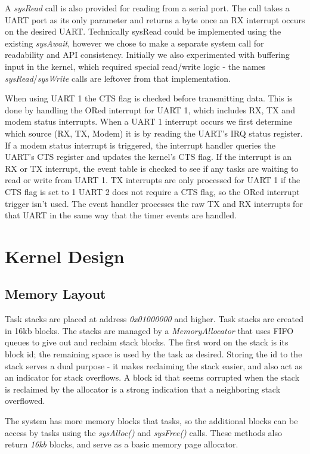 \documentclass[twoside,a4paper]{refart}
\begin{document}
A \textit{sysRead} call is also provided for reading from a serial port. The call takes a UART port as its only parameter and returns a byte once an RX interrupt occurs on the desired UART. Technically sysRead could be implemented using the existing \textit{sysAwait}, however we chose to make a separate system call for readability and API consistency. Initially we also experimented with buffering input in the kernel, which required special read/write logic - the names \textit{sysRead}/\textit{sysWrite} calls are leftover from that implementation.

When using UART 1 the CTS flag is checked before transmitting data. This is done by handling the ORed interrupt for UART 1, which includes RX, TX and modem status interrupts. When a UART 1 interrupt occurs we first determine which source (RX, TX, Modem) it is by reading the UART’s IRQ status register. If a modem status interrupt is triggered, the interrupt handler queries the UART’s CTS register and updates the kernel’s CTS flag. If the interrupt is an RX or TX interrupt, the event table is checked to see if any tasks are waiting to read or write from UART 1. TX interrupts are only processed for UART 1 if the CTS flag is set to 1 UART 2 does not require a CTS flag, so the ORed interrupt trigger isn’t used. The event handler processes the raw TX and RX interrupts for that UART in the same way that the timer events are handled.

\section{Kernel Design}

\subsection{Memory Layout}
Task stacks are placed at address \textit{0x01000000} and higher. Task stacks are created in 16kb blocks. The stacks are managed by a \textit{MemoryAllocator} that uses FIFO queues to give out and reclaim stack blocks. The first word on the stack is its block id; the remaining space is used by the task as desired. Storing the id to the stack serves a dual purpose - it makes reclaiming the stack easier, and also act as an indicator for stack overflows. A block id that seems corrupted when the stack is reclaimed by the allocator is a strong indication that a neighboring stack overflowed.

The system has more memory blocks that tasks, so the additional blocks can be access by tasks using the \textit{sysAlloc()} and \textit{sysFree()} calls. These methods also return \textit{16kb} blocks, and serve as a basic memory page allocator.
\end{document}
